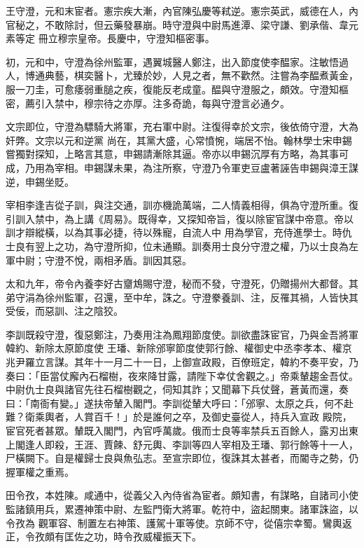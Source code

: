 \begin{pinyinscope}
 王守澄，元和末宦者。憲宗疾大漸，內官陳弘慶等弒逆。憲宗英武，威德在人，內官秘之，不敢除討，但云藥發暴崩。時守澄與中尉馬進潭、梁守謙、劉承偕、韋元素等定
 冊立穆宗皇帝。長慶中，守澄知樞密事。



 初，元和中，守澄為徐州監軍，遇翼城醫人鄭注，出入節度使李醖家。注敏悟過人，博通典藝，棋奕醫卜，尤臻於妙，人見之者，無不歡然。注嘗為李醖煮黃金，服一刀圭，可愈痿弱重膇之疾，復能反老成童。醖與守澄服之，頗效。守澄知樞密，薦引入禁中，穆宗待之亦厚。注多奇詭，每與守澄言必通夕。



 文宗即位，守澄為驃騎大將軍，充右軍中尉。注復得幸於文宗，後依倚守澄，大為奸弊。文宗以元和逆黨
 尚在，其黨大盛，心常憤惋，端居不怡。翰林學士宋申錫嘗獨對探知，上略言其意，申錫請漸除其逼。帝亦以申錫沉厚有方略，為其事可成，乃用為宰相。申錫謀未果，為注所察，守澄乃令軍吏豆盧著誣告申錫與漳王謀逆，申錫坐貶。



 宰相李逢吉從子訓，與注交通，訓亦機詭萬端，二人情義相得，俱為守澄所重。復引訓入禁中，為上講《周易》。既得幸，又探知帝旨，復以除宦官謀中帝意。帝以訓才辯縱橫，以為其事必捷，待以殊寵，自流人中
 用為學官，充侍進學士。時仇士良有翌上之功，為守澄所抑，位未通顯。訓奏用士良分守澄之權，乃以士良為左軍中尉；守澄不悅，兩相矛盾。訓因其惡。



 太和九年，帝令內養李好古齏鴆賜守澄，秘而不發，守澄死，仍贈揚州大都督。其弟守涓為徐州監軍，召還，至中牟，誅之。守澄豢養訓、注，反罹其禍，人皆快其受佞，而惡訓、注之陰狡。



 李訓既殺守澄，復惡鄭注，乃奏用注為鳳翔節度使。訓欲盡誅宦官，乃與金吾將軍韓約、新除太原節度使
 王璠、新除邠寧節度使郭行餘、權御史中丞李孝本、權京兆尹羅立言謀。其年十一月二十一日，上御宣政殿，百僚班定，韓約不奏平安，乃奏曰：「臣當仗廨內石榴樹，夜來降甘露，請陛下幸仗舍觀之。」帝乘輦趨金吾仗。中尉仇士良與諸官先往石榴樹觀之，伺知其詐；又聞幕下兵仗聲，蒼黃而還，奏曰：「南衙有變。」遂扶帝輦入閣門。李訓從輦大呼曰：「邠寧、太原之兵，何不赴難？衛乘輿者，人賞百千！」於是誰何之卒，及御史臺從人，持兵入宣政
 殿院，宦官死者甚眾。輦既入閣門，內官呼萬歲。俄而士良等率禁兵五百餘人，露刃出東上閣逢人即殺，王涯、賈餗、舒元輿、李訓等四人宰相及王璠、郭行餘等十一人，尸橫闕下。自是權歸士良與魚弘志。至宣宗即位，復誅其太甚者，而閽寺之勢，仍握軍權之重焉。



 田令孜，本姓陳。咸通中，從義父入內侍省為宦者。頗知書，有謀略，自諸司小使監諸鎮用兵，累遷神策中尉、左監門衛大將軍。乾符中，盜起關東。諸軍誅盜，以令孜為
 觀軍容、制置左右神策、護駕十軍等使。京師不守，從僖宗幸蜀。鸞輿返正，令孜頗有匡佐之功，時令孜威權振天下。




\end{pinyinscope}
